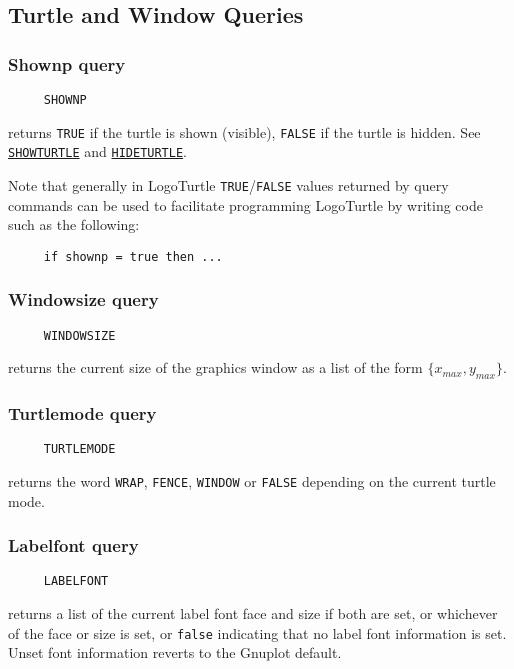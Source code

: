 \subsection{Turtle and Window Queries}

\subsubsection*{Shownp query}
\begin{verbatim}
     SHOWNP
\end{verbatim}
returns \texttt{TRUE} if the turtle is shown (visible), \texttt{FALSE}
if the turtle is hidden.  See
\hyperref[logoturtle:showturtle]{\texttt{SHOWTURTLE}} and
\hyperref[logoturtle:hideturtle]{\texttt{HIDETURTLE}}.

Note that generally in LogoTurtle \texttt{TRUE}/\texttt{FALSE} values
returned by query commands can be used to facilitate programming
LogoTurtle by writing code such as the following:
\begin{verbatim}
     if shownp = true then ...
\end{verbatim}

\subsubsection*{Windowsize query}
\begin{verbatim}
     WINDOWSIZE
\end{verbatim}
returns the current size of the graphics window as a list of the form
$\{x_{max},y_{max}\}$.

\subsubsection*{Turtlemode query}
\begin{verbatim}
     TURTLEMODE
\end{verbatim}
returns the word \texttt{WRAP}, \texttt{FENCE}, \texttt{WINDOW} or
\texttt{FALSE} depending on the current turtle mode.

\subsubsection*{Labelfont query}
\begin{verbatim}
     LABELFONT
\end{verbatim}
\label{logoturtle:labelfont}
returns a list of the current label font face and size if both are
set, or whichever of the face or size is set, or \texttt{false}
indicating that no label font information is set.  Unset font
information reverts to the Gnuplot default.

